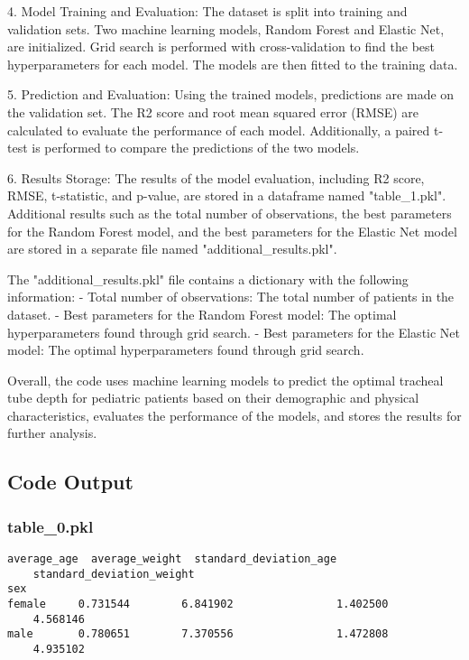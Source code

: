 \documentclass[11pt]{article}
\begin{document}
4. Model Training and Evaluation: The dataset is split into training and validation sets. Two machine learning models, Random Forest and Elastic Net, are initialized. Grid search is performed with cross-validation to find the best hyperparameters for each model. The models are then fitted to the training data.

5. Prediction and Evaluation: Using the trained models, predictions are made on the validation set. The R2 score and root mean squared error (RMSE) are calculated to evaluate the performance of each model. Additionally, a paired t-test is performed to compare the predictions of the two models.

6. Results Storage: The results of the model evaluation, including R2 score, RMSE, t-statistic, and p-value, are stored in a dataframe named "table\_1.pkl". Additional results such as the total number of observations, the best parameters for the Random Forest model, and the best parameters for the Elastic Net model are stored in a separate file named "additional\_results.pkl".

The "additional\_results.pkl" file contains a dictionary with the following information:
- Total number of observations: The total number of patients in the dataset.
- Best parameters for the Random Forest model: The optimal hyperparameters found through grid search.
- Best parameters for the Elastic Net model: The optimal hyperparameters found through grid search.

Overall, the code uses machine learning models to predict the optimal tracheal tube depth for pediatric patients based on their demographic and physical characteristics, evaluates the performance of the models, and stores the results for further analysis.

\subsection{Code Output}

\subsubsection*{table\_0.pkl}

\begin{Verbatim}[tabsize=4]
        average_age  average_weight  standard_deviation_age
	standard_deviation_weight
sex
female     0.731544        6.841902                1.402500
	4.568146
male       0.780651        7.370556                1.472808
	4.935102
\end{Verbatim}
\end{document}
